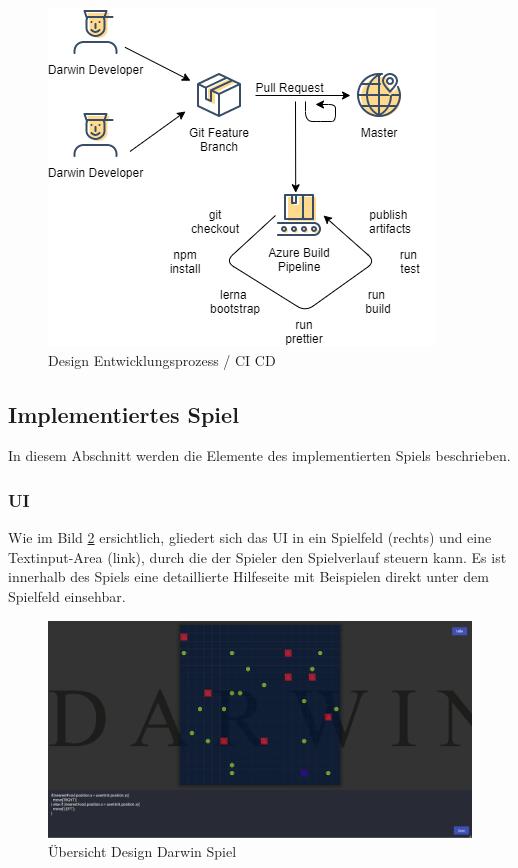 \documentclass[11pt,a4paper,titlepage]{article}
\begin{document}
\begin{figure}[H]
	\centering
	\includegraphics{workflow.png}
	\caption{Design Entwicklungsprozess / CI CD}
	\label{pipeline}
\end{figure}

\subsection{Implementiertes Spiel}

In diesem Abschnitt werden die Elemente des implementierten Spiels beschrieben.

\subsubsection{UI}

Wie im Bild \ref{gameplay} ersichtlich, gliedert sich das UI in ein Spielfeld (rechts) und eine Textinput-Area (link), durch die der Spieler den Spielverlauf steuern kann. Es ist innerhalb des Spiels eine detaillierte Hilfeseite mit Beispielen direkt unter dem Spielfeld einsehbar.

\begin{figure}[H]
	\centering
	\includegraphics[width=\textwidth]{darwin-gameplay.png}
	\caption{Übersicht Design Darwin Spiel}
	\label{gameplay}
\end{figure}
\end{document}
